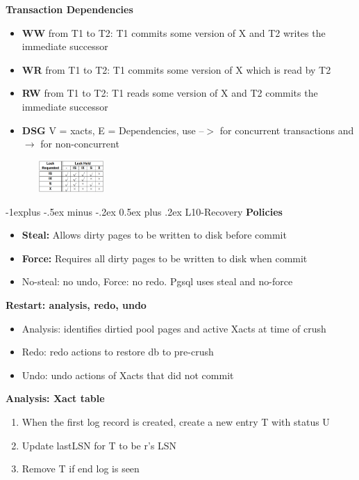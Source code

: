 \documentclass[10pt, landscape]{article}
\makeatletter
\renewcommand{\subsection}{\@startsection{subsection}{2}{0mm}%
                                {-1explus -.5ex minus -.2ex}%
                                {0.5ex plus .2ex}%
                                {\normalfont\normalsize\bfseries}}
\makeatother
\begin{document}
\begin{multicols}{4}
\textbf{Transaction Dependencies} \\
\begin{itemize}
  \item \textbf{WW} from T1 to T2: T1 commits some version of X and T2 writes the immediate successor
  \item \textbf{WR} from T1 to T2: T1 commits some version of X which is read by T2
  \item \textbf{RW} from T1 to T2: T1 reads some version of X and T2 commits the immediate successor
  \item \textbf{DSG} V = {xacts}, E = {Dependencies}, use --$>$ for concurrent transactions and $\rightarrow$ for non-concurrent
\end{itemize}
\includegraphics[width=5cm, height =1.2cm]{multigranular_locks.png}


\subsection{L10-Recovery}
\textbf{Policies} \\
\begin{itemize}
  \item \textbf{Steal:} Allows dirty pages to be written to disk before commit
  \item \textbf{Force:} Requires all dirty pages to be written to disk when commit
  \item No-steal: no undo, Force: no redo. Pgsql uses steal and no-force
\end{itemize}

\textbf{Restart: analysis, redo, undo} \\
\begin{itemize}
  \item Analysis: identifies dirtied pool pages and active Xacts at time of crush
  \item Redo: redo actions to restore db to pre-crush
  \item Undo: undo actions of Xacts that did not commit
\end{itemize}

\textbf{Analysis: Xact table} \\
\begin{enumerate}
  \item When the first log record is created, create a new entry T with status U
  \item Update lastLSN for T to be r's LSN
  \item Remove T if end log is seen
\end{enumerate}


\end{multicols}
\end{document}
